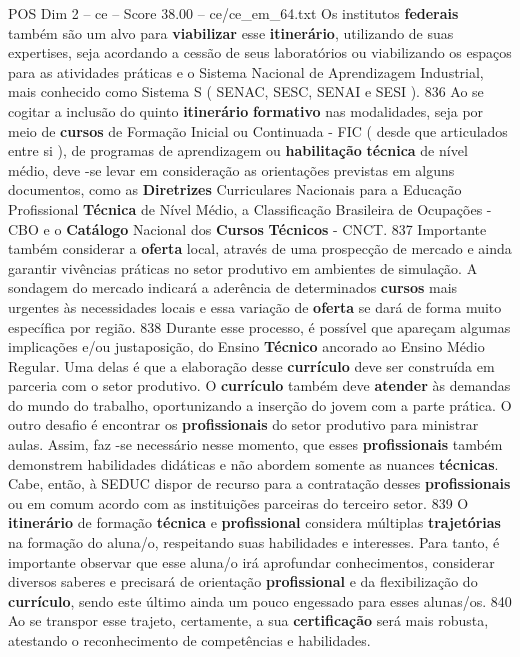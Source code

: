 \begin{textsample}{POS Dim 2 – ce – Score 38.00 – ce/ce\_em\_64.txt}
Os institutos \textbf{federais} também são um alvo para \textbf{viabilizar} esse \textbf{itinerário}, utilizando de suas expertises, seja acordando a cessão de seus laboratórios ou viabilizando os espaços para as atividades práticas e o Sistema Nacional de Aprendizagem Industrial, mais conhecido como Sistema S ( SENAC, SESC, SENAI e SESI ). 836 Ao se cogitar a inclusão do quinto \textbf{itinerário} \textbf{formativo} nas modalidades, seja por meio de \textbf{cursos} de Formação Inicial ou Continuada - FIC ( desde que articulados entre si ), de programas de aprendizagem ou \textbf{habilitação} \textbf{técnica} de nível médio, deve -se levar em consideração as orientações previstas em alguns documentos, como as \textbf{Diretrizes} Curriculares Nacionais para a Educação Profissional \textbf{Técnica} de Nível Médio, a Classificação Brasileira de Ocupações - CBO e o \textbf{Catálogo} Nacional dos \textbf{Cursos} \textbf{Técnicos} - CNCT. 837 Importante também considerar a \textbf{oferta} local, através de uma prospecção de mercado e ainda garantir vivências práticas no setor produtivo em ambientes de simulação.
A sondagem do mercado indicará a aderência de determinados \textbf{cursos} mais urgentes às necessidades locais e essa variação de \textbf{oferta} se dará de forma muito específica por região. 838 Durante esse processo, é possível que apareçam algumas implicações e/ou justaposição, do Ensino \textbf{Técnico} ancorado ao Ensino Médio Regular.
Uma delas é que a elaboração desse \textbf{currículo} deve ser construída em parceria com o setor produtivo.
O \textbf{currículo} também deve \textbf{atender} às demandas do mundo do trabalho, oportunizando a inserção do jovem com a parte prática.
O outro desafio é encontrar os \textbf{profissionais} do setor produtivo para ministrar aulas.
Assim, faz -se necessário nesse momento, que esses \textbf{profissionais} também demonstrem habilidades didáticas e não abordem somente as nuances \textbf{técnicas}.
Cabe, então, à SEDUC dispor de recurso para a contratação desses \textbf{profissionais} ou em comum acordo com as instituições parceiras do terceiro setor. 839 O \textbf{itinerário} de formação \textbf{técnica} e \textbf{profissional} considera múltiplas \textbf{trajetórias} na formação do aluna/o, respeitando suas habilidades e interesses.
Para tanto, é importante observar que esse aluna/o irá aprofundar conhecimentos, considerar diversos saberes e precisará de orientação \textbf{profissional} e da flexibilização do \textbf{currículo}, sendo este último ainda um pouco engessado para esses alunas/os. 840 Ao se transpor esse trajeto, certamente, a sua \textbf{certificação} será mais robusta, atestando o reconhecimento de competências e habilidades.

\end{textsample}
